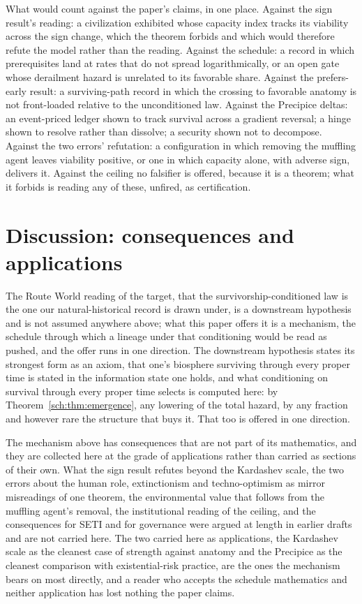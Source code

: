 What would count against the paper's claims, in one place. Against the
sign result's reading: a civilization exhibited whose capacity index
tracks its viability across the sign change, which the theorem forbids
and which would therefore refute the model rather than the reading.
Against the schedule: a record in which prerequisites land at rates
that do not spread logarithmically, or an open gate whose derailment
hazard is unrelated to its favorable share. Against the prefers-early
result: a surviving-path record in which the crossing to favorable
anatomy is not front-loaded relative to the unconditioned law. Against
the Precipice deltas: an event-priced ledger shown to track survival
across a gradient reversal; a hinge shown to resolve rather than
dissolve; a security shown not to decompose. Against the two errors'
refutation: a configuration in which removing the muffling agent leaves
viability positive, or one in which capacity alone, with adverse sign,
delivers it. Against the ceiling no falsifier is offered, because it is a
theorem; what it forbids is reading any of these, unfired, as
certification.

\section{Discussion: consequences and applications}\label{sec:discussion}

The Route World reading of the target, that the survivorship-conditioned
law is the one our natural-historical record is drawn under, is a
downstream hypothesis and is not assumed anywhere above; what this
paper offers it is a mechanism, the schedule through which a lineage
under that conditioning would be read as pushed, and the offer runs in
one direction. The downstream hypothesis states its strongest form as an
axiom, that one's biosphere surviving through every proper time is
stated in the information state one holds, and what conditioning on
survival through every proper time selects is computed here: by
Theorem~\ref{sch:thm:emergence}, any lowering of the total hazard, by
any fraction and however rare the structure that buys it. That too is
offered in one direction.

The mechanism above has consequences that are not part of its
mathematics, and they are collected here at the grade of applications
rather than carried as sections of their own. What the sign result
refutes beyond the Kardashev scale, the two errors about the human role,
extinctionism and techno-optimism as mirror misreadings of one theorem,
the environmental value that follows from the muffling agent's removal,
the institutional reading of the ceiling, and the consequences for SETI
and for governance were argued at length in earlier drafts and are
not carried here. The two carried
here as applications, the Kardashev scale as the cleanest case of
strength against anatomy and the Precipice as the cleanest comparison
with existential-risk practice, are the ones the mechanism bears on most
directly, and a reader who accepts the schedule mathematics and neither
application has lost nothing the paper claims.

